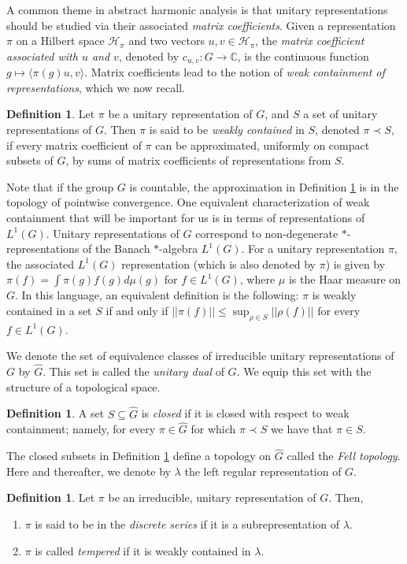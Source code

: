 \documentclass[12pt,reqno]{amsart}
\theoremstyle{definition}
\newtheorem{definition}[theorem]{Definition}
\begin{document}
A common theme in abstract harmonic analysis is that unitary representations should be studied via their associated \emph{matrix coefficients}. Given a representation $\pi$ on a Hilbert space $\mathcal H_{\pi}$ and two vectors $u,v \in \mathcal H_{\pi}$, the \emph{matrix coefficient associated with $u$ and $v$}, denoted by $c_{u,v}: G \rightarrow \mathbb{C}$, is the continuous function $g \mapsto \langle \pi(g)u,v\rangle $. Matrix coefficients lead to the notion of \emph{weak containment of representations}, which we now recall. 
\begin{definition}\label{def:weak cont}
    Let $\pi$ be a unitary representation of $G$, and $S$ a set of unitary representations of $G$. Then $\pi$ is said to be \emph{weakly contained} in $S$, denoted $\pi \prec S$, if every matrix coefficient of $\pi$ can be approximated, uniformly on compact subsets of $G$, by sums of matrix coefficients of representations from $S$.
\end{definition}
Note that if the group $G$ is countable, the approximation in Definition \ref{def:weak cont} is in the topology of pointwise convergence. One equivalent characterization of weak containment that will be important for us is in terms of representations of $L^1(G)$. Unitary representations of $G$ correspond to non-degenerate $*$-representations of the Banach $*$-algebra $L^1(G)$. For a unitary representation $\pi$, the associated $L^1(G)$ representation (which is also denoted by $\pi$) is given by $\pi(f)=\int\pi(g)f(g)d\mu(g)$ for $f \in L^1(G)$, where $\mu$ is the Haar measure on $G$. In this language, an equivalent definition is the following: $\pi$ is weakly contained in a set $S$ if and only if $|| \pi(f)|| \leq \sup_{\rho \in S}|| \rho(f) ||$ for every $f \in L^1(G)$.

We denote the set of equivalence classes of irreducible unitary representations of $G$ by $\widehat{G}$. This set is called the \emph{unitary dual} of $G$. We equip this set with the structure of a topological space.
\begin{definition}\label{def:Fell}
    A set $S \subseteq \widehat{G}$ is \emph{closed} if it is closed with respect to weak containment; namely, for every $\pi \in \widehat{G}$ for which $\pi \prec S$ we have that $\pi \in S$.
\end{definition}
The closed subsets in Definition \ref{def:Fell} define a topology on $\widehat{G}$ called the \emph{Fell topology}. Here and thereafter, we denote by $\lambda$ the left regular representation of $G$.
\begin{definition}\label{def:tempered and discrete}
    Let $\pi$ be an irreducible, unitary representation of $G$. Then,
    \begin{enumerate}
        \item $\pi$ is said to be in the \emph{discrete series} if it is a subrepresentation of $\lambda$.
        \item $\pi$ is called \emph{tempered} if it is weakly contained in $\lambda$.
    \end{enumerate}
\end{definition}
\end{document}
